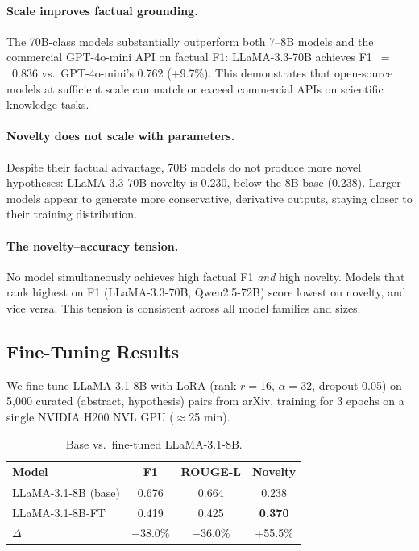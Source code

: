 \documentclass{article}
\begin{document}
\paragraph{Scale improves factual grounding.}
The 70B-class models substantially outperform both 7--8B models and
the commercial GPT-4o-mini API on factual F1:
LLaMA-3.3-70B achieves F1~$=$~0.836 vs.\ GPT-4o-mini's 0.762 ($+$9.7\%).
This demonstrates that open-source models at sufficient scale can match or
exceed commercial APIs on scientific knowledge tasks.

\paragraph{Novelty does not scale with parameters.}
Despite their factual advantage, 70B models do not produce more novel
hypotheses: LLaMA-3.3-70B novelty is 0.230, below the 8B base (0.238).
Larger models appear to generate more conservative, derivative outputs,
staying closer to their training distribution.

\paragraph{The novelty--accuracy tension.}
No model simultaneously achieves high factual F1 \emph{and} high novelty.
Models that rank highest on F1 (LLaMA-3.3-70B, Qwen2.5-72B) score lowest
on novelty, and vice versa.
This tension is consistent across all model families and sizes.

\subsection{Fine-Tuning Results}
\label{sec:finetune}

We fine-tune LLaMA-3.1-8B with LoRA (rank $r\!=\!16$, $\alpha\!=\!32$,
dropout 0.05) on 5{,}000 curated (abstract, hypothesis) pairs from arXiv,
training for 3 epochs on a single NVIDIA H200 NVL GPU (${\approx}$25 min).

\begin{table}[h]
\centering\small
\caption{Base vs.\ fine-tuned LLaMA-3.1-8B.}
\label{tab:finetune}
\setlength{\tabcolsep}{6pt}
\begin{tabular}{lccc}
\toprule
\textbf{Model} & \textbf{F1} & \textbf{ROUGE-L} & \textbf{Novelty} \\
\midrule
LLaMA-3.1-8B (base) & 0.676 & 0.664 & 0.238 \\
LLaMA-3.1-8B-FT     & 0.419 & 0.425 & \textbf{0.370} \\
\midrule
$\Delta$ & $-$38.0\% & $-$36.0\% & $+$55.5\% \\
\bottomrule
\end{tabular}
\end{table}
\end{document}
